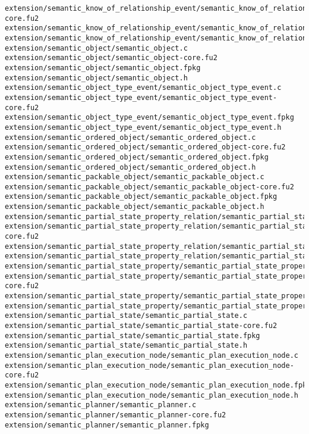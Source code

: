 \begin{lstlisting}
extension/semantic_know_of_relationship_event/semantic_know_of_relationship_event-core.fu2
extension/semantic_know_of_relationship_event/semantic_know_of_relationship_event.fpkg
extension/semantic_know_of_relationship_event/semantic_know_of_relationship_event.h
extension/semantic_object/semantic_object.c
extension/semantic_object/semantic_object-core.fu2
extension/semantic_object/semantic_object.fpkg
extension/semantic_object/semantic_object.h
extension/semantic_object_type_event/semantic_object_type_event.c
extension/semantic_object_type_event/semantic_object_type_event-core.fu2
extension/semantic_object_type_event/semantic_object_type_event.fpkg
extension/semantic_object_type_event/semantic_object_type_event.h
extension/semantic_ordered_object/semantic_ordered_object.c
extension/semantic_ordered_object/semantic_ordered_object-core.fu2
extension/semantic_ordered_object/semantic_ordered_object.fpkg
extension/semantic_ordered_object/semantic_ordered_object.h
extension/semantic_packable_object/semantic_packable_object.c
extension/semantic_packable_object/semantic_packable_object-core.fu2
extension/semantic_packable_object/semantic_packable_object.fpkg
extension/semantic_packable_object/semantic_packable_object.h
extension/semantic_partial_state_property_relation/semantic_partial_state_property_relation.c
extension/semantic_partial_state_property_relation/semantic_partial_state_property_relation-core.fu2
extension/semantic_partial_state_property_relation/semantic_partial_state_property_relation.fpkg
extension/semantic_partial_state_property_relation/semantic_partial_state_property_relation.h
extension/semantic_partial_state_property/semantic_partial_state_property.c
extension/semantic_partial_state_property/semantic_partial_state_property-core.fu2
extension/semantic_partial_state_property/semantic_partial_state_property.fpkg
extension/semantic_partial_state_property/semantic_partial_state_property.h
extension/semantic_partial_state/semantic_partial_state.c
extension/semantic_partial_state/semantic_partial_state-core.fu2
extension/semantic_partial_state/semantic_partial_state.fpkg
extension/semantic_partial_state/semantic_partial_state.h
extension/semantic_plan_execution_node/semantic_plan_execution_node.c
extension/semantic_plan_execution_node/semantic_plan_execution_node-core.fu2
extension/semantic_plan_execution_node/semantic_plan_execution_node.fpkg
extension/semantic_plan_execution_node/semantic_plan_execution_node.h
extension/semantic_planner/semantic_planner.c
extension/semantic_planner/semantic_planner-core.fu2
extension/semantic_planner/semantic_planner.fpkg

\end{lstlisting}
